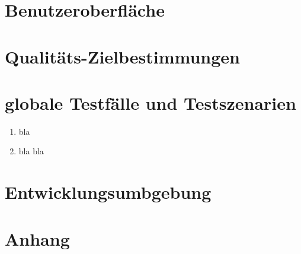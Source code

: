 \documentclass[parskip=full]{scrartcl}
\def\threedigits#1{%
  \ifnum#1<100 0\fi
  \ifnum#1<10 0\fi
  \number#1}
\begin{document}
\section{Benutzeroberfläche}

\section{Qualitäts-Zielbestimmungen}

\section{globale Testfälle und Testszenarien}

\begin{enumerate}[label={\textbf{/T\protect\threedigits{\theenumi}0/}}, leftmargin=*]
	\item bla
	\item bla bla
\end{enumerate}

\section{Entwicklungsumbgebung}

\section{Anhang}	
\end{document}
